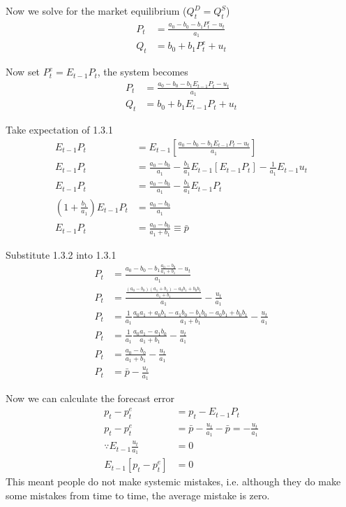 \documentclass[twocolumn, fleqn]{article}
\begin{document}
		Now we solve for the market equilibrium ($Q_t^D = Q_t^S$)
		\begin{align*}
			P_t & = \frac{a_0 - b_0 -b_1 P_t^e-u_t}{a_1} \\
			Q_t &= b_0 + b_{1}P_t^e + u_t
		\end{align*}

		Now set $P_t^e = E_{t-1}P_t$, the system becomes
		\begin{align*}
			P_t & = \frac{a_0 - b_0 -b_1 E_{t-1}P_t-u_t}{a_1} \tag{1.3.1}\\
			Q_t &= b_0 + b_{1}E_{t-1}P_t + u_t
		\end{align*}

		Take expectation of 1.3.1
		\begin{align*}
			E_{t-1} P_t & = E_{t-1} \left[  \frac{a_0 - b_0 -b_1 E_{t-1}P_t-u_t}{a_1}\right]\\
			E_{t-1} P_t & = \frac{a_0 - b_0}{a_1} - \frac{b_1}{a_1}E_{t-1}[E_{t-1} P_t] - \frac{1}{a_1}E_{t-1} u_t\\
			E_{t-1} P_t & = \frac{a_0 - b_0}{a_1} - \frac{b_1}{a_1}E_{t-1} P_t\\
			\left( 1+ \frac{b_1}{a_1} \right)E_{t-1} P_t & =\frac{a_0 - b_0}{a_1}\\
			E_{t-1} P_t & = \frac{a_0-b_0}{a_1 +b_1}\equiv \bar{p} \tag{1.3.2}
		\end{align*}

		Substitute 1.3.2 into 1.3.1
		\begin{align*}
			P_t & = \frac{a_0 - b_0 -b_1 \frac{a_0-b_0}{a_1 +b_1}-u_t}{a_1}\\
			P_t & = \frac{ \frac{(a_0 - b_0)(a_1 +b_1)-a_0b_1+b_0b_1}{a_1 +b_1}}{a_1} -\frac{u_t}{a_1}\\
			P_t & = \frac{1}{a_1} \frac{a_0a_1 + a_0b_1-a_1b_0-b_1b_0-a_0b_1+b_0b_1}{a_1 +b_1} -\frac{u_t}{a_1}\\
			P_t & = \frac{1}{a_1} \frac{a_0a_1 -a_1b_0}{a_1 +b_1} -\frac{u_t}{a_1}\\
			P_t & =  \frac{a_0 -b_0}{a_1 +b_1} -\frac{u_t}{a_1}\\
			P_t & =  \bar{p} -\frac{u_t}{a_1}
		\end{align*}

		Now we can calculate the forecast error
		\begin{align*}
			p_t - p_t^e &=p_t - E_{t-1}P_t\\
			p_t - p_t^e &= \bar{p} -\frac{u_t}{a_1} - \bar{p}= -\frac{u_t}{a_1}\\
			\because E_{t-1}\frac{u_t}{a_1}&=0\\
			E_{t-1}[p_t - p_t^e] &=0
		\end{align*}
		This meant people do not make systemic mistakes, i.e. although they do make some mistakes from time to time,
		the average mistake is zero.
\end{document}
